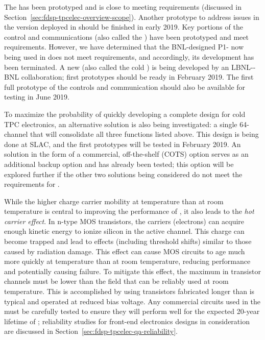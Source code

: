 The   has been prototyped and is close to meeting requirements (discussed in Section~\ref{sec:fdsp-tpcelec-overview-scope}). Another prototype to address issues in the version deployed in  should be finished in early 2019. Key portions of the control and communications  (also called the  ) have been prototyped and meet requirements.  However, we have determined that the BNL-designed P1-  now being used in  does not meet requirements, and accordingly, its development has been terminated.  A new   (also called the cold  ) is being developed by an LBNL-\fnal-BNL collaboration; first prototypes should be ready in February 2019.  The first full prototype of the controls and communication  should also be available for testing in June 2019.

To maximize the probability of quickly developing a complete design for cold TPC  electronics, an alternative solution is also being investigated: a single \num{64}-channel  that will consolidate all three functions listed above.  This design is being done at SLAC, and the first prototypes will be tested in February 2019.  An  solution in the form of a commercial, off-the-shelf (COTS) option serves as an additional backup option and has already been tested; this option will be explored further if the other two  solutions being considered do not meet the requirements for .

While the higher charge carrier mobility at  temperature than at room temperature is central to improving the performance of , it also leads to the \textit{hot carrier effect}.  In n-type MOS  transistors, the carriers (electrons) can acquire enough kinetic energy to ionize silicon in the active channel.  This charge can become trapped and lead to effects (including threshold shifts) similar to those caused by radiation damage.  This effect can cause MOS circuits to age much more quickly at  temperature than at room temperature, reducing performance and potentially causing failure.  To mitigate this effect, the maximum \efield in transistor channels must be lower than the field that can be reliably used at room temperature.  This is accomplished by using transistors fabricated longer than is typical and operated at reduced bias voltage.  Any commercial circuits used in the  must be carefully tested to ensure they will perform well for the expected \num{20}-year lifetime of ; reliability studies for front-end electronics designs in consideration are discussed in Section~\ref{sec:fdsp-tpcelec-qa-reliability}.

